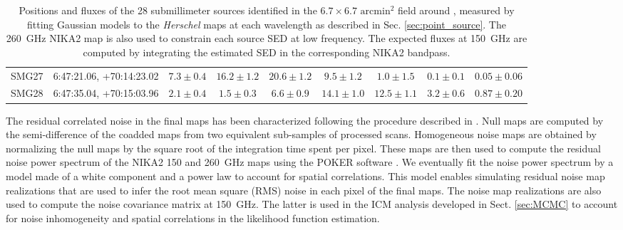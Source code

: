 \documentclass[traditabstract]{aa}
\begin{document}
\begin{table}[h]
\begin{center}
\begin{tabular}{ccccccccc}
SMG27 & 6:47:21.06, +70:14:23.02 & $7.3\pm 0.4$ & $16.2\pm 1.2$ & $20.6\pm 1.2$ & $9.5\pm 1.2$ & $1.0\pm  1.5$& $0.1\pm  0.1$ & $0.05\pm  0.06$\\
SMG28 & 6:47:35.04, +70:15:03.96 & $2.1\pm 0.4$ & $1.5\pm 0.3$ & $6.6\pm 0.9$ & $14.1\pm 1.0$ & $12.5\pm  1.1$& $3.2\pm  0.6$ & $0.87\pm  0.20$\\
\hline
\hline
\end{tabular}
\end{center}
\caption{{\footnotesize Positions and fluxes of the 28 submillimeter sources identified in the $6.7 \times 6.7$ $\mathrm{arcmin^2}$ field around \psz, measured by fitting Gaussian models to the {\it Herschel} maps at each wavelength as described in Sec. \ref{sec:point_source}. The 260~GHz NIKA2 map is also used to constrain each source SED at low frequency. The expected fluxes at 150~GHz are computed by integrating the estimated SED in the corresponding NIKA2 bandpass.}}
\label{tab:Submm_ps_flux}
\end{table}
\indent The residual correlated noise in the final maps has been characterized following the procedure described in \citep{ada16a}. Null maps are computed by the semi-difference of the coadded maps from two equivalent sub-samples of processed scans. Homogeneous noise maps are obtained by normalizing the null maps by the square root of the integration time spent per pixel. These maps are then used to compute the residual noise power spectrum of the NIKA2 150 and 260~GHz maps using the POKER software \citep{pon11}. We eventually fit the noise power spectrum by a model made of a white component and a power law to account for spatial correlations. This model enables simulating residual noise map realizations that are used to infer the root mean square (RMS) noise in each pixel of the final maps. The noise map realizations are also used to compute the noise covariance matrix at 150~GHz. The latter is used in the ICM analysis developed in Sect. \ref{sec:MCMC} to account for noise inhomogeneity and spatial correlations in the likelihood function estimation.
\end{document}
